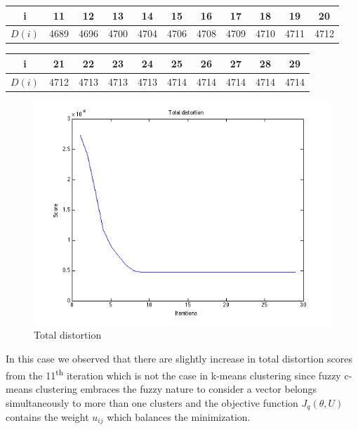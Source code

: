 \documentclass[a4paper]{article}
\begin{document}
	\begin{center}
		\begin{tabular}{ |c |c |c |c |c |c |c |c |c |c |c| }
			\hline
			i & 11 & 12 & 13 & 14 & 15 & 16 & 17 & 18 & 19 & 20 \\ \hline
			$D(i)$ & 4689 & 4696 & 4700 & 4704 & 4706 & 4708 & 4709 & 4710 & 4711 & 4712 \\ \hline
		\end{tabular}
	\end{center}
	
	\begin{center}
		\begin{tabular}{ |c |c |c |c |c |c |c |c |c |c| }
			\hline
			i & 21 & 22 & 23 & 24 & 25 & 26 & 27 & 28 & 29 \\ \hline
			$D(i)$ & 4712 & 4713 & 4713 & 4713 & 4714 & 4714 & 4714 & 4714 & 4714 \\ \hline
		\end{tabular}
	\end{center}

	\begin{figure}[H]
		\centering
			\includegraphics[scale=.55]{images/total_distortion.png}
		\caption{Total distortion}
	\end{figure}
	
	In this case we observed that there are slightly increase in total distortion scores from the 11\textsuperscript{th} iteration which is not the case in k-means clustering since fuzzy c-means clustering embraces the fuzzy nature to consider a vector belongs simultaneously to more than one clusters and the objective function $J_q(\theta, U)$ contains the weight $u_{ij}$ which balances the minimization.
	
\end{document}
